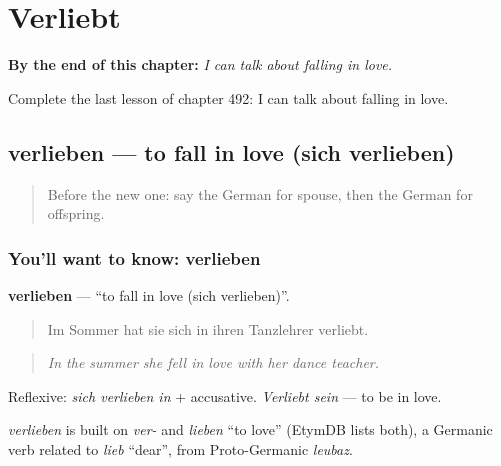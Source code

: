 
\chapter{Verliebt}
\label{ch:ge-verliebt}

\begin{chapteropening}
\textbf{By the end of this chapter:} \emph{I can talk about falling in love.}

Complete the last lesson of chapter 492: I can talk about falling in love.
\end{chapteropening}

\section[verlieben]{verlieben — to fall in love (sich verlieben)}

\label{lesson:GE-C492-verlieben}



\begin{quote}
Before the new one: say the German for spouse, then the German for offspring.
\end{quote}

\subsection*{You'll want to know: verlieben}
\textbf{verlieben} — \textquotedblleft{}to fall in love (sich verlieben)\textquotedblright{}.

\begin{quote}
Im Sommer hat sie sich in ihren Tanzlehrer verliebt.
\end{quote}

\begin{quote}
\emph{In the summer she fell in love with her dance teacher.}
\end{quote}

Reflexive: \emph{sich verlieben in} + accusative. \emph{Verliebt sein} — to be in love.

\begin{cousinweb}
\emph{verlieben} is built on \emph{ver-} and \emph{lieben} \textquotedblleft{}to love\textquotedblright{} (EtymDB lists both), a Germanic verb related to \emph{lieb} \textquotedblleft{}dear\textquotedblright{}, from Proto-Germanic \emph{leubaz}.
\end{cousinweb}

